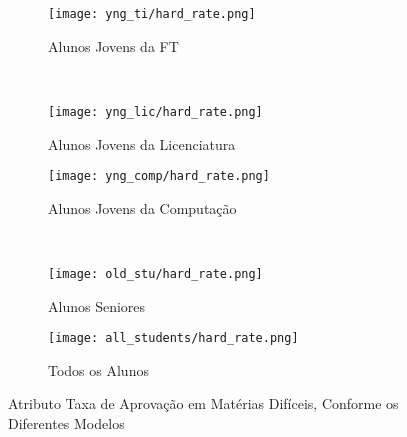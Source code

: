 \clearpage
\begin{figure}[!ht]
    \centering
    \begin{subfigure}[b]{0.48\textwidth}
        \centering
        \texttt{[image: yng\_ti/hard\_rate.png]}
        \caption{Alunos Jovens da FT}
    \end{subfigure}
    ~
    \begin{subfigure}[b]{0.48\textwidth}
        \centering
        \texttt{[image: yng\_lic/hard\_rate.png]}
        \caption{Alunos Jovens da Licenciatura}
    \end{subfigure}

    \begin{subfigure}[b]{0.48\textwidth}
        \centering
        \texttt{[image: yng\_comp/hard\_rate.png]}
        \caption{Alunos Jovens da Computação}
    \end{subfigure}
    ~
    \begin{subfigure}[b]{0.48\textwidth}
        \centering
        \texttt{[image: old\_stu/hard\_rate.png]}
        \caption{Alunos Seniores}
    \end{subfigure}

    \begin{subfigure}[b]{0.48\textwidth}
        \centering
        \texttt{[image: all\_students/hard\_rate.png]}
        \caption{Todos os Alunos}
    \end{subfigure}
    \caption{Atributo Taxa de Aprovação em Matérias Difíceis, Conforme os Diferentes
    Modelos}
\end{figure}

